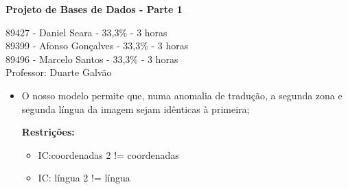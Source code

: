 \documentclass[12pt]{report}
\begin{document}
    \begin{titlepage}
        \begin{center}

            \vspace*{\fill}
            \Huge
            \textbf{Projeto de Bases de Dados - Parte 1}
            
            \vspace*{\fill}

            \Large
            89427 - Daniel Seara - 33,3\% - 3 horas \\
            89399 - Afonso Gonçalves - 33,3\% - 3 horas \\
            89496 - Marcelo Santos - 33,3\% - 3 horas \\

            \bigskip
            Professor: Duarte Galvão
        
        \end{center}
\end{titlepage}

\clearpage\mbox{}\clearpage

    \LARGE

    \normalsize
    \begin{itemize}
        \item O nosso modelo permite que, numa anomalia de tradução, a segunda zona e segunda língua da imagem sejam idênticas à primeira;
    
            \quad \textbf{Restrições:}
            \begin{itemize}
                \item IC:coordenadas 2 != coordenadas
                \item IC: língua 2 != língua
            \end{itemize}  
          
    \end{itemize}
\end{document}
